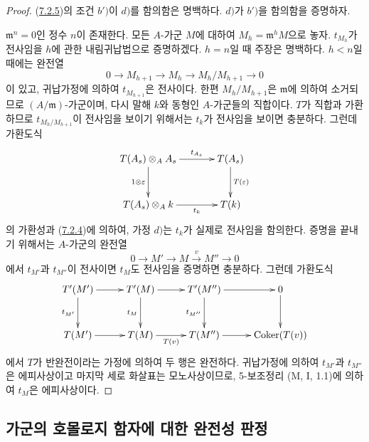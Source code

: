 \begin{proof}
(\hyperref[III.7.2.5-fr]{7.2.5})의 조건 $b')$이 $d)$를 함의함은
명백하다. $d)$가 $b')$을 함의함을 증명하자.

$\mathfrak m^n=0$인 정수 $n$이 존재한다. 모든 $A$-가군 $M$에 대하여
$M_h=\mathfrak m^hM$으로 놓자. $t_{M_h}$가 전사임을 $h$에 관한
내림귀납법으로 증명하겠다. $h=n$일 때 주장은 명백하다. $h<n$일 때에는
완전열
\[
  0\longrightarrow M_{h+1}
  \longrightarrow M_h
  \longrightarrow M_h/M_{h+1}
  \longrightarrow 0
\]
이 있고, 귀납가정에 의하여 $t_{M_{h+1}}$은 전사이다. 한편
$M_h/M_{h+1}$은 $\mathfrak m$에 의하여 소거되므로
$(A/\mathfrak m)$-가군이며, 다시 말해 $k$와 동형인 $A$-가군들의
직합이다. $T$가 직합과 가환하므로 $t_{M_h/M_{h+1}}$이 전사임을
보이기 위해서는 $t_k$가 전사임을 보이면 충분하다. 그런데 가환도식
\[
\xymatrix@C=35pt@R=30pt{
  T(A_s)\otimes_A A_s
  \ar[r]^-{t_{A_s}}\ar[d]_{1\otimes\varepsilon}
  &
  T(A_s)\ar[d]^{T(\varepsilon)}
  \\
  T(A_s)\otimes_A k
  \ar[r]_-{t_k}
  &
  T(k)
}
\]
의 가환성과 (\hyperref[III.7.2.4-fr]{7.2.4})에 의하여, 가정 $d)$는
$t_k$가 실제로 전사임을 함의한다. 증명을 끝내기 위해서는 $A$-가군의
완전열
\[
  0\longrightarrow M'
  \longrightarrow M
  \xrightarrow{v}M''
  \longrightarrow 0
\]
에서 $t_{M'}$과 $t_{M''}$이 전사이면 $t_M$도 전사임을 증명하면
충분하다. 그런데 가환도식
\[
\xymatrix@C=27pt@R=30pt{
  T'(M')\ar[r]\ar[d]_{t_{M'}}
  &
  T'(M)\ar[r]\ar[d]_{t_M}
  &
  T'(M'')\ar[r]\ar[d]_{t_{M''}}
  &
  0\ar[d]
  \\
  T(M')\ar[r]
  &
  T(M)\ar[r]_-{T(v)}
  &
  T(M'')\ar[r]
  &
  \operatorname{Coker}(T(v))
}
\]
에서 $T$가 반완전이라는 가정에 의하여 두 행은 완전하다. 귀납가정에
의하여 $t_{M'}$과 $t_{M''}$은 에피사상이고 마지막 세로 화살표는
모노사상이므로, 5-보조정리 (M, I, 1.1)에 의하여 $t_M$은
에피사상이다.
\end{proof}

\subsection{가군의 호몰로지 함자에 대한 완전성 판정}
\label{subsection:III.7.3.fr}

